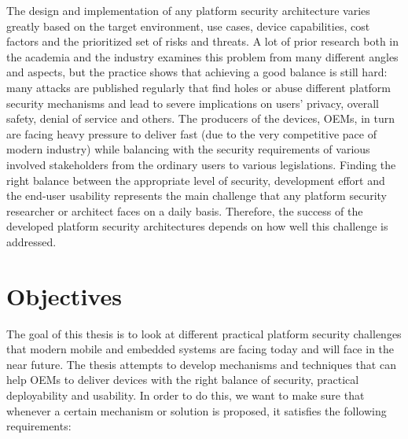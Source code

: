 The design and implementation of any platform security architecture varies greatly based on the target environment, use cases, device capabilities, cost factors and the prioritized set of risks and threats. A lot of prior research both in the academia and the industry examines this problem from many different angles and aspects, but the practice shows that achieving a good balance is still hard: many attacks are published regularly that find holes or abuse different platform security mechanisms and lead to severe implications on users' privacy, overall safety, denial of service and others. The producers of the devices, OEMs, in turn are facing heavy pressure to deliver fast (due to the very competitive pace of modern industry) while balancing with the security requirements of various involved stakeholders from the ordinary users to various legislations. Finding the right balance between the appropriate level of security, development effort and the end-user usability represents the main challenge that any platform security researcher or architect faces on a daily basis. Therefore, the success of the developed platform security architectures depends on how well this challenge is addressed.   

\section{Objectives}
\label{sec:Objectives}

The goal of this thesis is to look at different practical platform security challenges that modern mobile and embedded systems are facing today and will face in the near future. The thesis attempts to develop mechanisms and techniques that can help OEMs to deliver devices with the right balance of security, practical deployability and usability. In order to do this, we want to make sure that whenever a certain mechanism or solution is proposed, it satisfies the following requirements:

